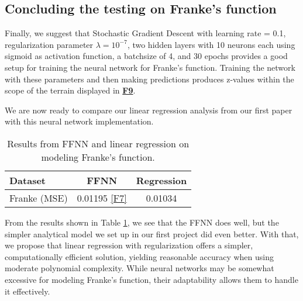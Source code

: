 \documentclass{article}
\begin{document}
\begin{multicols}{2}
\subsection*{Concluding the testing on Franke's function}

Finally, we suggest that Stochastic Gradient Descent with learning rate = 0.1, regularization parameter $\lambda = 10^{-7}$, two hidden layers with 10 neurons each using sigmoid as activation function, a batchsize of 4, and 30 epochs provides a good setup for training the neural network for Franke's function. Training the network with these parameters and then making predictions produces z-values within the scope of the terrain displayed in \hyperref[fig:F9]{\textbf{F9}}.

We are now ready to compare our linear regression analysis from our first paper \cite{oa_brovold_eg_hansen_hg_kornstad_regression_2024} with this neural network implementation. 
\begin{table}[H]
\centering
\begin{tabular}{|l|c|c|}
\hline
\textbf{Dataset} & \textbf{FFNN} & \textbf{Regression} \\
\hline
Franke (MSE) & 0.01195 \hyperref[fig:F7]{[F7]} & 0.01034 \cite{oa_brovold_eg_hansen_hg_kornstad_regression_2024}\\
\hline
\end{tabular}
\caption{Results from FFNN and linear regression on modeling Franke's function.}
\label{tab:table1}
\end{table}

From the results shown in Table \ref{tab:table1}, we see that the FFNN does well, but the simpler analytical model we set up in our first project \cite{oa_brovold_eg_hansen_hg_kornstad_regression_2024} did even better. With that, we propose that linear regression with regularization offers a simpler, computationally efficient solution, yielding reasonable accuracy when using moderate polynomial complexity. While neural networks may be somewhat excessive for modeling Franke's function, their adaptability allows them to handle it effectively.
\end{multicols}
\end{document}
